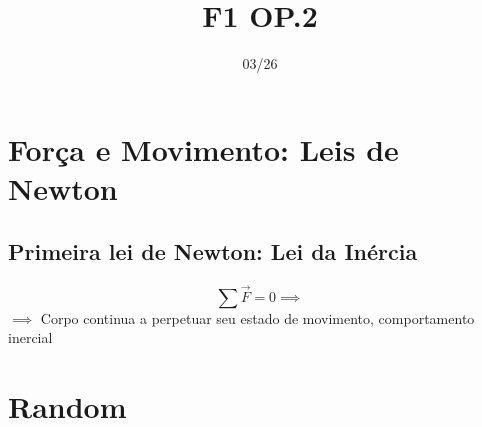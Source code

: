 \documentclass[12pt]{article}
\begin{document}
\title{F1 OP.2}
\date{03/26}
\maketitle
\tableofcontents
\break

\section{Força e Movimento: Leis de Newton}

\subsection{Primeira lei de Newton: Lei da Inércia}
\[ \sum \vec F = 0 \implies \]
$\implies $ Corpo continua a perpetuar seu estado de movimento, comportamento inercial




\section{Random}

\subsection{}
\end{document}
